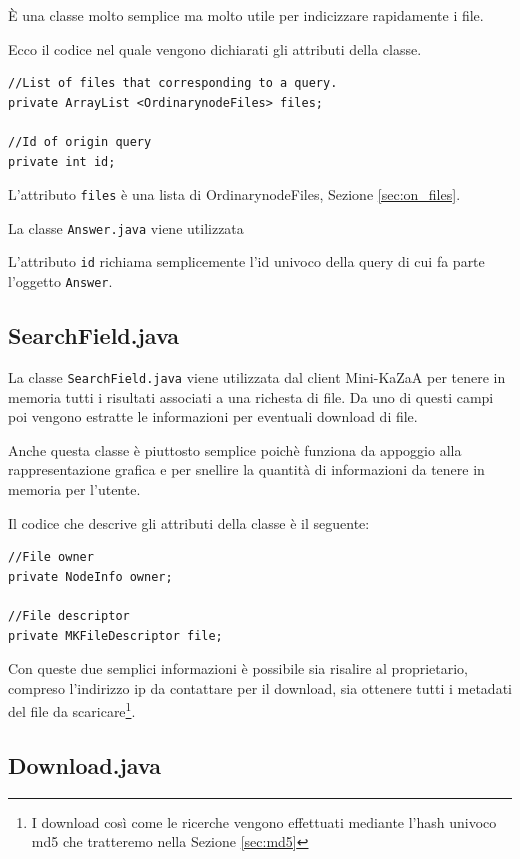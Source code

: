 \`{E} una classe molto semplice ma molto utile per indicizzare rapidamente i file.

Ecco il codice nel quale vengono dichiarati gli attributi della classe.
\newline
\begin{lstlisting}
//List of files that corresponding to a query.
private ArrayList <OrdinarynodeFiles> files;

//Id of origin query
private int id;
\end{lstlisting}

L'attributo \verb|files| è una lista di OrdinarynodeFiles, Sezione \ref{sec:on_files}.

La classe \verb|Answer.java| viene utilizzata 

L'attributo \verb|id| richiama semplicemente l'id univoco della query di cui fa parte l'oggetto \verb|Answer|.

\subsection{SearchField.java}
La classe \verb|SearchField.java| viene utilizzata dal client Mini-KaZaA per tenere in memoria tutti i risultati
associati a una richesta di file.
Da uno di questi campi poi vengono estratte le informazioni per eventuali download di file.

Anche questa classe è piuttosto semplice poichè funziona da appoggio alla rappresentazione grafica e per snellire
la quantità di informazioni da tenere in memoria per l'utente.

Il codice che descrive gli attributi della classe è il seguente:
\newline
\begin{lstlisting}
//File owner
private NodeInfo owner;

//File descriptor
private MKFileDescriptor file;
\end{lstlisting}

Con queste due semplici informazioni è possibile sia risalire al proprietario, compreso l'indirizzo ip da contattare
per il download, sia ottenere tutti i metadati del file da scaricare\footnote{I download così come le ricerche vengono
effettuati mediante l'hash univoco md5 che tratteremo nella Sezione \ref{sec:md5}}.

\subsection{Download.java}

